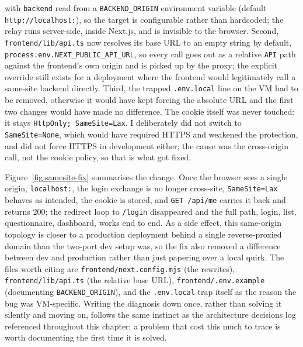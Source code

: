 with \texttt{backend} read from a \texttt{BACKEND\_\allowbreak ORIGIN} environment variable (default \texttt{http:\allowbreak /\allowbreak /\allowbreak localhost:}), so the target is configurable rather than hardcoded; the relay runs server-side, inside Next.js, and is invisible to the browser. Second, \texttt{frontend/\allowbreak lib/\allowbreak api.\allowbreak ts} now resolves its base URL to an empty string by default, \texttt{process.\allowbreak env.\allowbreak NEXT\_\allowbreak PUBLIC\_\allowbreak API\_\allowbreak URL}, so every call goes out as a relative \texttt{API} path against the frontend's own origin and is picked up by the proxy; the explicit override still exists for a deployment where the frontend would legitimately call a same-site backend directly. Third, the trapped \texttt{.\allowbreak env.\allowbreak local} line on the VM had to be removed, otherwise it would have kept forcing the absolute URL and the first two changes would have made no difference. The cookie itself was never touched: it stays \texttt{Http\allowbreak Only; Same\allowbreak Site=Lax}. I deliberately did not switch to \texttt{Same\allowbreak Site=None}, which would have required HTTPS and weakened the protection, and did not force HTTPS in development either; the cause was the cross-origin call, not the cookie policy, so that is what got fixed.

Figure~\ref{fig:samesite-fix} summarises the change. Once the browser sees a single origin, \texttt{localhost:}, the login exchange is no longer cross-site, \texttt{Same\allowbreak Site=Lax} behaves as intended, the cookie is stored, and \texttt{GET /\allowbreak api/\allowbreak me} carries it back and returns 200; the redirect loop to \texttt{/\allowbreak login} disappeared and the full path, login, list, questionnaire, dashboard, works end to end. As a side effect, this same-origin topology is closer to a production deployment behind a single reverse-proxied domain than the two-port dev setup was, so the fix also removed a difference between dev and production rather than just papering over a local quirk. The files worth citing are \texttt{frontend/\allowbreak next.\allowbreak config.\allowbreak mjs} (the rewrites), \texttt{frontend/\allowbreak lib/\allowbreak api.\allowbreak ts} (the relative base URL), \texttt{frontend/\allowbreak .\allowbreak env.\allowbreak example} (documenting \texttt{BACKEND\_\allowbreak ORIGIN}), and the \texttt{.\allowbreak env.\allowbreak local} trap itself as the reason the bug was VM-specific. Writing the diagnosis down once, rather than solving it silently and moving on, follows the same instinct as the architecture decisions log referenced throughout this chapter: a problem that cost this much to trace is worth documenting the first time it is solved.

